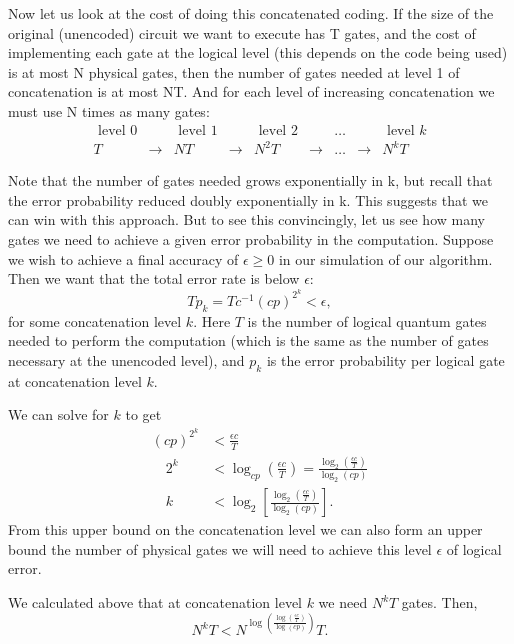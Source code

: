 Now let us look at the cost of doing this concatenated coding. If the size of the original (unencoded) circuit we want to execute has T gates, and the cost of implementing each gate at the logical level (this depends on the code being used) is at most N physical gates, then the number of gates needed at level 1 of concatenation is at most NT. And for each level of increasing concatenation we must use N times as many gates:
$$
\begin{array}{cccccccccc}
\text { level } 0 & & \text { level } 1 & & \text { level } 2 & & \ldots  & & \text { level } k\\
T &\rightarrow & NT &\rightarrow & N^2T & \rightarrow & \ldots &\rightarrow& N^kT
\end{array}
$$


Note that the number of gates needed grows exponentially in k, but recall that the error probability reduced doubly exponentially in k. This suggests that we can win with this approach. But to see this convincingly, let us see how many gates we need to achieve a given error probability in the computation. Suppose we wish to achieve a final accuracy of $\epsilon \geq 0$ in our simulation of our algorithm.
Then we want that the total error rate is below $\epsilon$: 
$$
T p_{k}=T c^{-1}(c p)^{2^{k}}<\epsilon,
$$
for some concatenation level $k$. Here $T$ is the number of logical quantum gates needed to perform the computation (which is the same as the number of gates necessary at the unencoded level), and $p_{k}$ is the error probability per logical gate at concatenation level $k$.


We can solve for $k$ to get
$$
\begin{aligned}
(c p)^{2^{k}}&<\frac{\epsilon c}{T} \\
 \quad  2^{k}&<\log _{c p}\left(\frac{\epsilon c}{T}\right)=\frac{\log_2 \left(\frac{\epsilon c}{T}\right)}{\log_2 (c p)} \\
\quad  k&<\log_2 \left[\frac{\log_2 \left(\frac{\epsilon c}{T}\right)}{\log_2 (c p)}\right].
\end{aligned}
$$
From this upper bound on the concatenation level we can also form an upper bound the number of physical gates we will need to achieve this level $\epsilon$ of logical error. 

We calculated above that at concatenation level $k$ we need $N^{k} T$ gates. Then,
$$
N^{k} T<N^{\log \left(\frac{\log \left(\frac{\epsilon c}{T}\right)}{\log (c p)}\right)} T.
$$


